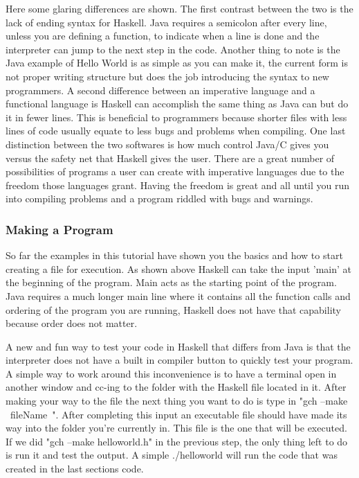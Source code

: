 \documentclass{article}
\begin{document}
    \medskip
    Here some glaring differences are shown. The first contrast between the two is the lack of ending syntax for Haskell. Java requires a semicolon after every line, unless you are defining a function, to indicate when a line is done and the interpreter can jump to the next step in the code. Another thing to note is the Java example of Hello World is as simple as you can make it, the current form is not proper writing structure but does the job introducing the syntax to new programmers. A second difference between an imperative language and a functional language is Haskell can accomplish the same thing as Java can but do it in fewer lines. This is beneficial to programmers because shorter files with less lines of code usually equate to less bugs and problems when compiling. One last distinction between the two softwares is how much control Java/C gives you versus the safety net that Haskell gives the user. There are a great number of possibilities of programs a user can create with imperative languages due to the freedom those languages grant. Having the freedom is great and all until you run into compiling problems and a program riddled with bugs and warnings. 
    
    \subsubsection{Making a Program}
    So far the examples in this tutorial have shown you the basics and how to start creating a file for execution. As shown above Haskell can take the input 'main' at the beginning of the program. Main acts as the starting point of the program. Java requires a much longer main line where it contains all the function calls and ordering of the program you are running, Haskell does not have that capability because order does not matter. 
    
    \medskip A new and fun way to test your code in Haskell that differs from Java is that the interpreter does not have a built in compiler button to quickly test your program. A simple way to work around this inconvenience is to have a terminal open in another window and cc-ing to the folder with the Haskell file located in it. After making your way to the file the next thing you want to do is type in "gch --make ~fileName~". After completing this input an executable file should have made its way into the folder you're currently in. This file is the one that will be executed. If we did "gch --make helloworld.h" in the previous step, the only thing left to do is run it and test the output. A simple ./helloworld will run the code that was created in the last sections code. 
    
\end{document}
